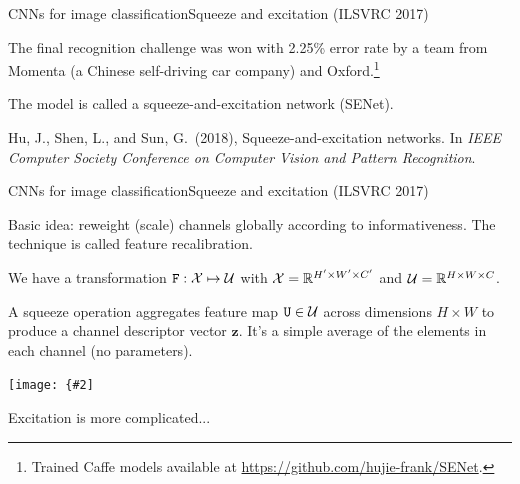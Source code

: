 \documentclass{beamer}
\renewcommand{\vec}[1]{\boldsymbol{#1}}
\newcommand{\mat}[1]{\mathtt{#1}}
\def\Rset{\mathbb{R}}
\newcommand{\myfig}[3]{\centerline{\texttt{[image: \{\#2]}}}
\begin{document}
\begin{frame}{CNNs for image classification}{Squeeze and excitation (ILSVRC 2017)}

  The final recognition challenge was won with 2.25\% error rate by a
  team from Momenta (a Chinese self-driving car company) and
  Oxford.\footnote{Trained Caffe models available at
    \url{https://github.com/hujie-frank/SENet}.}

  \medskip

  The model is called a squeeze-and-excitation network (SENet).
  
  \medskip

  Hu, J., Shen, L., and Sun, G.\ (2018), Squeeze-and-excitation
  networks.  In \textit{IEEE Computer Society Conference on Computer
    Vision and Pattern Recognition}.

\end{frame}


\begin{frame}{CNNs for image classification}{Squeeze and excitation (ILSVRC 2017)}

  Basic idea: reweight (scale) channels globally according to
  informativeness. The technique is called \alert{feature
    recalibration}.

  \medskip

  We have a transformation $\mat{F} : {\cal X} \mapsto {\cal U}$ with
  ${\cal X} = \Rset^{H' \times W' \times C'}$ and ${\cal U} =
  \Rset^{H\times W\times C}$.

  \medskip

  A \alert{squeeze} operation aggregates feature map $\mat{U} \in
  {\cal U}$ across dimensions $H \times W$ to produce a \alert{channel
    descriptor} vector $\vec{z}$. It's a simple average of the
  elements in each channel (no parameters).

  \medskip
  
  \myfig{4in}{hu-fig1}{Hu, Shen, and Sun (2018), Fig.\ 1}

  \medskip

  Excitation is more complicated...
  
\end{frame}
\end{document}
